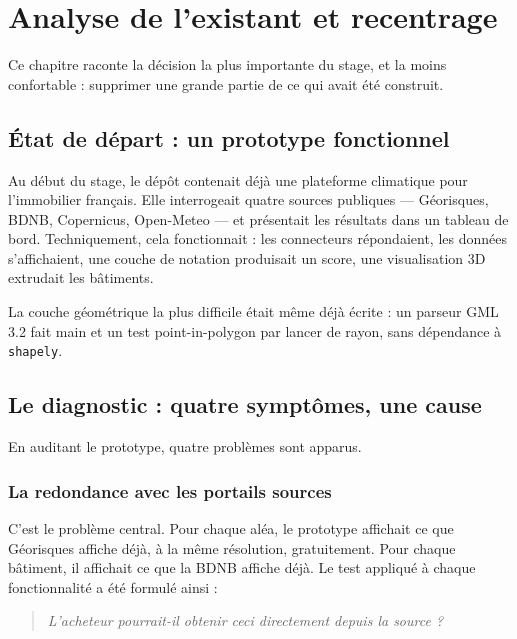 \chapter{Analyse de l'existant et recentrage}
\label{ch:existant}

Ce chapitre raconte la décision la plus importante du stage, et la moins
confortable : supprimer une grande partie de ce qui avait été construit.

\section{État de départ : un prototype fonctionnel}

Au début du stage, le dépôt contenait déjà une plateforme climatique pour
l'immobilier français. Elle interrogeait quatre sources publiques — Géorisques,
BDNB, Copernicus, Open-Meteo — et présentait les résultats dans un tableau de
bord. Techniquement, cela fonctionnait : les connecteurs répondaient, les
données s'affichaient, une couche de notation produisait un score, une
visualisation 3D extrudait les bâtiments.

La couche géométrique la plus difficile était même déjà écrite : un parseur GML
3.2 fait main et un test point-in-polygon par lancer de rayon, sans dépendance
à \texttt{shapely}.

\section{Le diagnostic : quatre symptômes, une cause}

En auditant le prototype, quatre problèmes sont apparus.

\subsection{La redondance avec les portails sources}

C'est le problème central. Pour chaque aléa, le prototype affichait ce que
Géorisques affiche déjà, à la même résolution, gratuitement. Pour chaque
bâtiment, il affichait ce que la BDNB affiche déjà. Le test appliqué à chaque
fonctionnalité a été formulé ainsi :

\begin{quote}
\itshape
L'acheteur pourrait-il obtenir ceci directement depuis la source ?
\end{quote}

